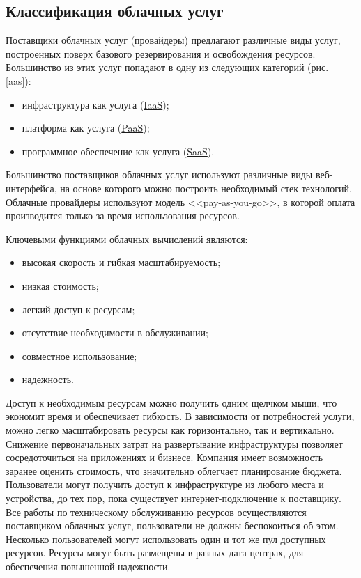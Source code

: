 \subsection{Классификация облачных услуг}

Поставщики облачных услуг (провайдеры) предлагают различные виды услуг, построенных поверх базового резервирования и освобождения ресурсов.
Большинство из этих услуг попадают в одну из следующих категорий (рис. \ref{aas}):
\begin{itemize}
  \item инфраструктура как услуга (\hyperlink{iaas}{IaaS});
  \item платформа как услуга (\hyperlink{paas}{PaaS});
  \item программное обеспечение как услуга (\hyperlink{saas}{SaaS}).
\end{itemize}


Большинство поставщиков облачных услуг используют различные виды веб-интерфейса, на основе которого можно построить необходимый стек технологий.
Облачные провайдеры используют модель <<pay-as-you-go>>, в которой оплата производится только за время использования ресурсов.

Ключевыми функциями облачных вычислений являются:
\begin{itemize}
  \item высокая скорость и гибкая масштабируемость;
  \item низкая стоимость;
  \item легкий доступ к ресурсам;
  \item отсутствие необходимости в обслуживании;
  \item совместное использование;
  \item надежность.
\end{itemize}

Доступ к необходимым ресурсам можно получить одним щелчком мыши, что экономит время и обеспечивает гибкость.
В зависимости от потребностей услуги, можно легко масштабировать ресурсы как горизонтально, так и вертикально.
Снижение первоначальных затрат на развертывание инфраструктуры позволяет сосредоточиться на приложениях и бизнесе.
Компания имеет возможность заранее оценить стоимость, что значительно облегчает планирование бюджета.
Пользователи могут получить доступ к инфраструктуре из любого места и устройства, до тех пор, пока существует интернет-подключение к поставщику.
Все работы по техническому обслуживанию ресурсов осуществляются поставщиком облачных услуг, пользователи не должны беспокоиться об этом.
Несколько пользователей могут использовать один и тот же пул доступных ресурсов.
Ресурсы могут быть размещены в разных дата-центрах, для обеспечения повышенной надежности.

